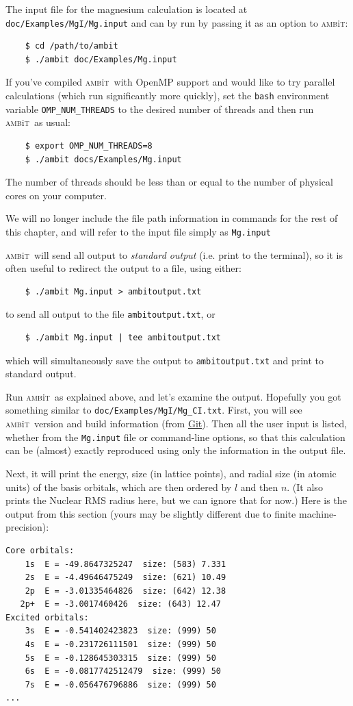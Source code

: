 \documentclass{report}
\newcommand{\ambit}{\textsc{amb}{\footnotesize i}\textsc{t}}
\begin{document}
The input file for the magnesium calculation is located at 
\texttt{doc/Examples/MgI/Mg.input} and can by run by passing it as an option to
\ambit:

\begin{verbatim}
	$ cd /path/to/ambit
	$ ./ambit doc/Examples/Mg.input
\end{verbatim}

If you've compiled \ambit\  with OpenMP support and would like to try parallel calculations (which run
significantly more quickly), set the \texttt{bash} environment variable \texttt{OMP\_NUM\_THREADS} to
the desired number of threads and then run \ambit\  as usual:

\begin{verbatim}
	$ export OMP_NUM_THREADS=8
	$ ./ambit docs/Examples/Mg.input
\end{verbatim}

The number of threads should be less than or equal to the number of physical cores on your computer.

We will no longer include the file path information in commands for the rest of this chapter, and will
refer to the input file simply as \texttt{Mg.input}

\ambit\  will send all output to \textit{standard output} (i.e. print to the terminal), so it is often
useful to redirect the output to a file, using either:
\begin{verbatim}
	$ ./ambit Mg.input > ambitoutput.txt
\end{verbatim}
to send all output to the file \texttt{ambitoutput.txt}, or
\begin{verbatim}
	$ ./ambit Mg.input | tee ambitoutput.txt
\end{verbatim}
which will simultaneously save the output to \texttt{ambitoutput.txt} and print to standard output.

Run \ambit\ as explained above, and let's examine the output. Hopefully you got something similar to \texttt{doc/Examples/MgI/Mg\_CI.txt}.
First, you will see \ambit\ version and build information (from \href{https://git-scm.com/}{Git}). Then all the user input is listed, whether from the \texttt{Mg.input} file or command-line options, so that this calculation can be (almost) exactly reproduced using only the information in the output file.

Next, it will print the energy, size (in lattice points), and radial size (in atomic units) of the basis orbitals, which are then ordered by $l$ and then $n$. (It also prints the Nuclear RMS radius here, but we can ignore that for now.) Here is the output from this section (yours may be slightly different due to finite machine-precision):
\begin{verbatim}
Core orbitals: 
    1s  E = -49.8647325247  size: (583) 7.331
    2s  E = -4.49646475249  size: (621) 10.49
    2p  E = -3.01335464826  size: (642) 12.38
   2p+  E = -3.0017460426  size: (643) 12.47
Excited orbitals: 
    3s  E = -0.541402423823  size: (999) 50
    4s  E = -0.231726111501  size: (999) 50
    5s  E = -0.128645303315  size: (999) 50
    6s  E = -0.0817742512479  size: (999) 50
    7s  E = -0.056476796886  size: (999) 50
...
\end{verbatim}
\end{document}
